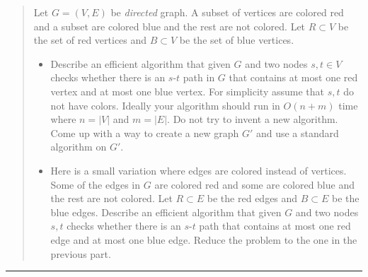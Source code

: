\documentclass[11pt]{article}
\begin{document}



\begin{quote}
Let $G=(V,E)$ be \emph{directed} graph. A subset of vertices are colored
  red and a subset are colored blue and the rest are not colored.  Let
  $R \subset V$ be the set of red vertices and $B \subset V$ be the set
  of blue vertices.
  \begin{itemize}
  \item Describe an efficient algorithm that given $G$ and
  two nodes $s,t \in V$ checks whether there is an $s$-$t$ path in $G$
  that contains at most one red vertex and at most one blue
  vertex. For simplicity assume that $s,t$ do not have colors. Ideally
  your algorithm should run in $O(n+m)$ time where $n = |V|$ and $m = |E|$.
  Do not try to invent a new algorithm. Come up with a way to create
  a new graph $G'$ and use a standard algorithm on $G'$.
\item Here is a small variation where edges are colored instead of
  vertices.  Some of the edges in $G$ are colored red and some are
  colored blue and the rest are not colored. Let $R \subset E$ be the
  red edges and $B \subset E$ be the blue edges. Describe an efficient
  algorithm that given $G$ and two nodes $s,t$ checks whether there is
  an $s$-$t$ path that contains at most one red edge and at most one
  blue edge. Reduce the problem to the one in the previous part.
  \end{itemize}
\end{quote}
\hrule
\end{document}
